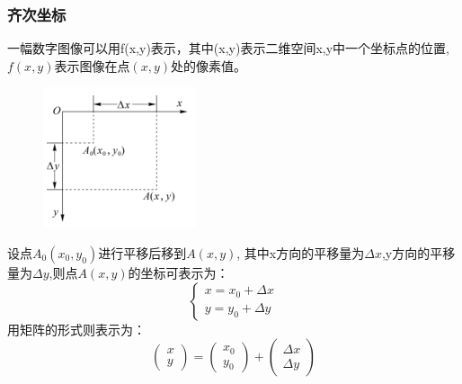 \documentclass[11pt]{article}
\begin{document}
\subsubsection{齐次坐标}
一幅数字图像可以用f(x,y)表示，其中(x,y)表示二维空间x,y中一个坐标点的位置,$f(x,y)$表示图像在点$(x,y)$处的像素值。

\begin{figure}
\centering
\includegraphics[width=0.23\textheight]{2}
\end{figure}
设点$A_0(x_0,y_0)$进行平移后移到$A(x,y)$, 其中x方向的平移量为$\Delta x$,y方向的平移量为$\Delta y$,则点$A(x,y)$的坐标可表示为：
$$\left\{\begin{matrix}
	x=x_0 + \Delta x\\ 
	y=y_0 + \Delta y
\end{matrix}\right.$$
用矩阵的形式则表示为：
$$\begin{pmatrix}x \\y\end{pmatrix}=\begin{pmatrix}x_0 \\y_0\end{pmatrix}+\begin{pmatrix}\Delta x \\ \Delta y\end{pmatrix}$$
\end{document}
